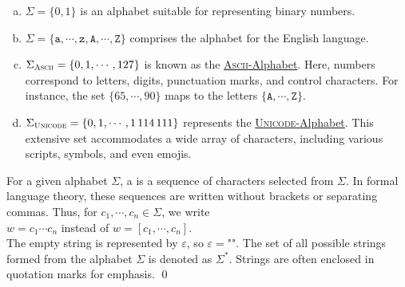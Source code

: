 \examplesEng
\begin{enumerate}[(a)]
\item \( \Sigma = \{ 0, 1 \} \) is an alphabet suitable for representing binary numbers.
\item \( \Sigma = \{ \mathtt{a}, \cdots, \mathtt{z}, \mathtt{A}, \cdots, \mathtt{Z} \} \) comprises the alphabet for the English language.
\item \( \Sigma_{\textsc{\scriptsize Ascii}} = \{ 0, 1, \cdots, 127 \} \) is known as the
      \href{http://en.wikipedia.org/wiki/ASCII}{\textsc{Ascii}-Alphabet}.  Here,
      numbers correspond to letters, digits, punctuation marks, and control characters. For instance, the set
      \( \{ 65, \cdots, 90 \} \) maps to the letters \( \{ \mathtt{A}, \cdots, \mathtt{Z} \} \).
\item \( \Sigma_{\textsc{\scriptsize Unicode}} = \{ 0, 1, \cdots, 1\,114\,111 \} \) represents the
      \href{https://en.wikipedia.org/wiki/Unicode}{\textsc{Unicode}-Alphabet}. 
      This extensive set accommodates a wide array of characters, including various scripts, symbols, and even emojis. 
\eox
\end{enumerate}

\begin{Definition}[Strings]
For a given alphabet \( \Sigma \), a   is a sequence of characters selected from \( \Sigma \). In formal language theory, these sequences are written without brackets or separating commas. Thus, for \( c_1, \cdots, c_n \in \Sigma \), we write
\\[0.2cm]
\hspace*{1.3cm}
\( w = c_1 \cdots c_n \) \quad instead of \quad \( w = [c_1, \cdots, c_n] \).
\\[0.2cm]
The empty string is represented by \( \varepsilon \), \index{\( \varepsilon \)} so \( \varepsilon = \texttt{""} \).
The set of all possible strings formed from the alphabet \( \Sigma \) is denoted as \( \Sigma^* \). \index{\( \Sigma^* \)} Strings are often enclosed in quotation marks for emphasis.
\qed
\end{Definition}

